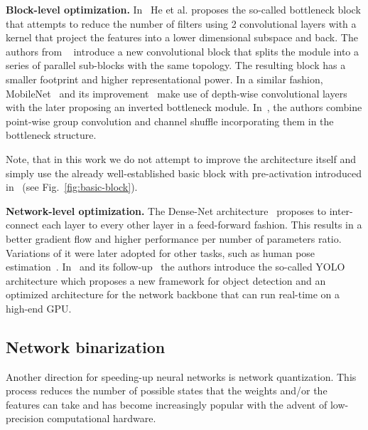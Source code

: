 \documentclass[10pt,twocolumn,letterpaper]{article}
\begin{document}
\textbf{Block-level optimization.} In~\cite{he2016deep} He et al. proposes the so-called bottleneck block that attempts to reduce the number of  filters using 2 convolutional layers with a  kernel that project the features into a lower dimensional subspace and back.  The authors from ~\cite{xie2016aggregated} introduce a new convolutional block that splits the module into a series of parallel sub-blocks with the same topology. The resulting block has a smaller footprint and higher representational power. In a similar fashion, MobileNet~\cite{howard2017mobilenets} and its improvement~\cite{sandler2018mobilenetv2} make use of depth-wise convolutional layers with the later proposing an inverted bottleneck module. In~\cite{zhang2018shufflenet}, the authors combine point-wise group convolution and channel shuffle incorporating them in the bottleneck structure.

Note, that in this work we do not attempt to improve the architecture itself and simply use the already well-established basic block with pre-activation introduced in~\cite{he2016identity} (see Fig.~\ref{fig:basic-block}).

\textbf{Network-level optimization.} The Dense-Net architecture~\cite{huang2016densely} proposes to inter-connect each layer to every other layer in a feed-forward fashion. This results in a better gradient flow and higher performance per number of parameters ratio. Variations of it were later adopted for other tasks, such as human pose estimation~\cite{tang2018quantized}. In~\cite{redmon2016you} and its follow-up~\cite{redmon2017yolo9000} the authors introduce the so-called YOLO architecture which proposes a new framework for object detection and an optimized architecture for the network backbone that can run real-time on a high-end GPU.

\subsection{Network binarization}\label{ssec:network-binarization}
Another direction for speeding-up neural networks is network quantization. This process reduces the number of possible states that the weights and/or the features can take and has become increasingly popular with the advent of low-precision computational hardware. 
\end{document}

